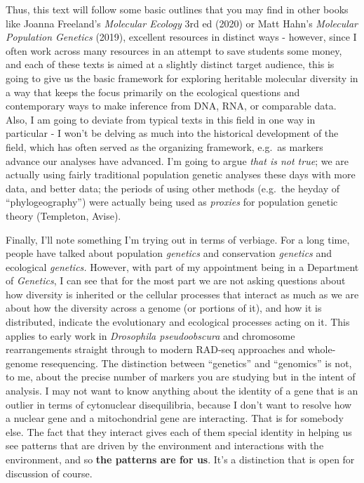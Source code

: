 \documentclass[
]{article}
\begin{document}
Thus, this text will follow some basic outlines that you may find in
other books like Joanna Freeland's \emph{Molecular Ecology} 3rd ed
(2020) or Matt Hahn's \emph{Molecular Population Genetics} (2019),
excellent resources in distinct ways - however, since I often work
across many resources in an attempt to save students some money, and
each of these texts is aimed at a slightly distinct target audience,
this is going to give us the basic framework for exploring heritable
molecular diversity in a way that keeps the focus primarily on the
ecological questions and contemporary ways to make inference from DNA,
RNA, or comparable data. Also, I am going to deviate from typical texts
in this field in one way in particular - I won't be delving as much into
the historical development of the field, which has often served as the
organizing framework, e.g.~as markers advance our analyses have
advanced. I'm going to argue \emph{that is not true}; we are actually
using fairly traditional population genetic analyses these days with
more data, and better data; the periods of using other methods (e.g.~the
heyday of ``phylogeography'') were actually being used as \emph{proxies}
for population genetic theory (Templeton, Avise).

Finally, I'll note something I'm trying out in terms of verbiage. For a
long time, people have talked about population \emph{genetics} and
conservation \emph{genetics} and ecological \emph{genetics.} However,
with part of my appointment being in a Department of \emph{Genetics}, I
can see that for the most part we are not asking questions about how
diversity is inherited or the cellular processes that interact as much
as we are about how the diversity across a genome (or portions of it),
and how it is distributed, indicate the evolutionary and ecological
processes acting on it. This applies to early work in \emph{Drosophila
pseudoobscura} and chromosome rearrangements straight through to modern
RAD-seq approaches and whole-genome resequencing. The distinction
between ``genetics'' and ``genomics'' is not, to me, about the precise
number of markers you are studying but in the intent of analysis. I may
not want to know anything about the identity of a gene that is an
outlier in terms of cytonuclear disequilibria, because I don't want to
resolve how a nuclear gene and a mitochondrial gene are interacting.
That is for somebody else. The fact that they interact gives each of
them special identity in helping us see patterns that are driven by the
environment and interactions with the environment, and so \textbf{the
patterns are for us}. It's a distinction that is open for discussion of
course.
\end{document}
